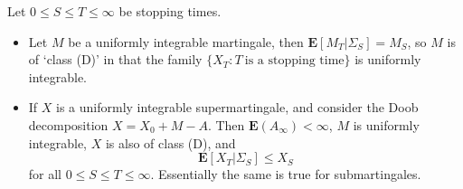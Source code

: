 \begin{theorem}
    Let $0 \leq S \leq T \leq \infty$ be stopping times.
    \begin{itemize}
        \item Let $M$ be a uniformly integrable martingale, then $\mathbf{E}[M_T|\Sigma_S] = M_S$, so $M$ is of `class (D)' in that the family $\{ X_T: T\ \text{is a stopping time} \}$ is uniformly integrable.

        \item If $X$ is a uniformly integrable supermartingale, and consider the Doob decomposition $X = X_0 + M - A$. Then $\mathbf{E}(A_\infty) < \infty$, $M$ is uniformly integrable, $X$ is also of class (D), and
        \[ \mathbf{E}[X_T|\Sigma_S] \leq X_S \]
        for all $0 \leq S \leq T \leq \infty$. Essentially the same is true for submartingales.
    \end{itemize}
\end{theorem}
